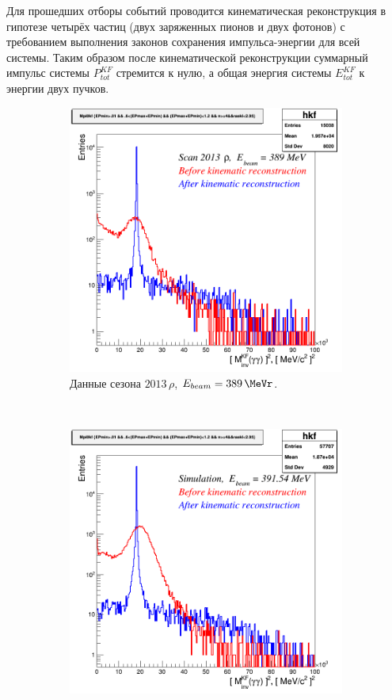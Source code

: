 Для прошедших отборы событий проводится кинематическая реконструкция в гипотезе четырёх частиц (двух заряженных пионов и двух фотонов) с требованием выполнения законов сохранения импульса-энергии для всей системы.
Таким образом после кинематической реконструкции суммарный импульс системы $P^{KF}_{tot}$ стремится к нулю,
а общая энергия системы $E^{KF}_{tot}$ к энергии двух пучков.
\begin{figure}[htbp]
    \centering
    \begin{subfigure}[t]{0.45\textwidth}
        \includegraphics[width=\textwidth]{img/diff_kf_mpi0_2013rho389.png}
        \caption{Данные сезона $2013 \, \rho$, $E_{beam} = \SI{389}{\MeVr}$.}
        \label{fig:diff_kf_mpi0_2013rho389}
    \end{subfigure}
    ~
    \begin{subfigure}[t]{0.45\textwidth}
        \includegraphics[width=\textwidth]{img/diff_kf_mpi0_sim391_54.png}

\end{subfigure}
\end{figure}
